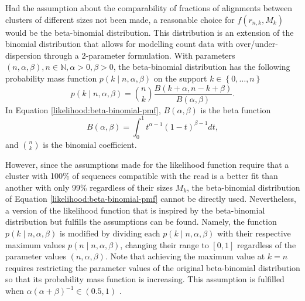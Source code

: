 \documentclass[officiallayout]{tktla}
\begin{document}
Had the assumption about the comparability of fractions of
alignments between clusters of different sizes not been made, a reasonable choice
for $f\left(r_{n, k}, M_{k}\right)$ would be the beta-binomial
distribution. This distribution is an extension of the binomial
distribution that allows for modelling count data with
over/under-dispersion through a 2-parameter formulation. With
parameters $\left(n, \alpha, \beta\right), n \in \mathbb{N}, \alpha >
0, \beta > 0$, the beta-binomial distribution has the following
probability mass function $p\left(k \middle| n, \alpha, \beta\right)$
on the support $k \in \left\{0, \dots, n\right\}$
\begin{equation}
  \label{likelihood:beta-binomial-pmf}
  p\left(k \middle| n, \alpha, \beta\right) = \binom{n}{k}\frac{B\left(k + \alpha, n - k + \beta\right)}{B\left(\alpha, \beta\right)}.
\end{equation}
In Equation \ref{likelihood:beta-binomial-pmf}, $B\left(\alpha, \beta\right)$ is the beta function
\begin{equation}
  \label{likelihood:beta-function}
  B\left(\alpha, \beta\right) = \int_{0}^{1}t^{\alpha - 1}\left(1 - t\right)^{\beta - 1}dt,
\end{equation}
and $\binom{n}{k}$ is the binomial coefficient.

However, since the assumptions made for the likelihood function
require that a cluster with 100\% of sequences compatible with the
read is a better fit than another with only 99\% regardless of their
sizes $M_{k}$, the beta-binomial distribution of Equation
\ref{likelihood:beta-binomial-pmf} cannot be directly
used. Nevertheless, a version of the likelihood function that is
inspired by the beta-binomial distribution but fulfills the
assumptions can be found. Namely, the function $p\left(k \middle| n,
\alpha, \beta\right)$ is modified by dividing each $p\left(k \middle|
n, \alpha, \beta\right)$ with their respective maximum values
$p\left(n \middle| n, \alpha, \beta\right)$, changing their range to
$\left[0, 1\right]$ regardless of the parameter values $\left(n,
\alpha, \beta \right)$. Note that achieving the maximum value at $k =
n$ requires restricting the parameter values of the original
beta-binomial distribution so that its probability mass function is
increasing. This assumption is fulfilled when $\alpha\left(\alpha +
\beta\right)^{-1} \in \left(0.5, 1\right)$ \citep{berg1993condorcet}.
\end{document}
